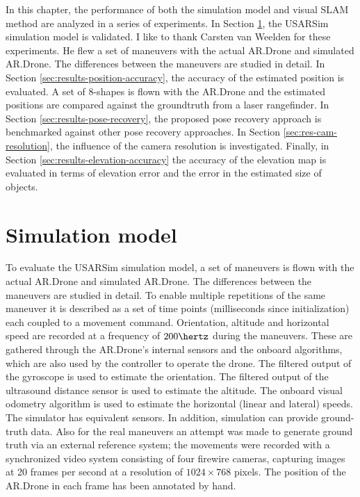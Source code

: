 In this chapter, the performance of both the simulation model and visual SLAM method are analyzed in a series of experiments.
In Section \ref{sec:simulation_results}, the USARSim simulation model is validated.
I like to thank Carsten van Weelden for these experiments.
He flew a set of maneuvers with the actual AR.Drone and simulated AR.Drone. The differences between the maneuvers are studied in detail.
In Section \ref{sec:results-position-accuracy}, the accuracy of the estimated position is evaluated.
A set of 8-shapes is flown with the AR.Drone and the estimated positions are compared against the groundtruth from a laser rangefinder.
In Section \ref{sec:results-pose-recovery}, the proposed pose recovery approach is benchmarked against other pose recovery approaches.
In Section \ref{sec:res-cam-resolution}, the influence of the camera resolution is investigated.
Finally, in Section \ref{sec:results-elevation-accuracy} the accuracy of the elevation map is evaluated in terms of elevation error and the error in the estimated size of objects.


	\section{Simulation model}
\label{sec:simulation_results}
To evaluate the USARSim simulation model,  
a set of maneuvers is flown with the actual AR.Drone and
simulated AR.Drone. The differences between the maneuvers are studied in detail. To enable multiple repetitions of the same maneuver it is
described as a set of time points (milliseconds since initialization) each coupled to a movement command.
Orientation, altitude and horizontal speed are recorded at a frequency of $200\hertz$ during the maneuvers. These are gathered through the AR.Drone's internal sensors and the onboard algorithms, which are
also used by the controller to operate the drone. The filtered output of the gyroscope is used
to estimate the orientation. The filtered output of the ultrasound distance sensor is used to estimate
the altitude. The onboard visual odometry algorithm is used to estimate the horizontal (linear
and lateral) speeds. The simulator has equivalent sensors. In addition, simulation can provide ground-truth data. 
Also for the real maneuvers an attempt was made to generate ground truth via an external reference system; the movements were recorded with a synchronized video system consisting of four firewire cameras, capturing images at 20 frames per second at a resolution of $1024 \times 768$ pixels. The position of the AR.Drone 
in each frame has been annotated by hand. 

